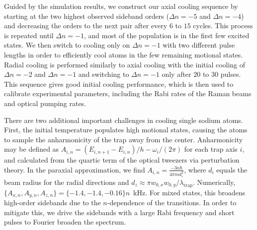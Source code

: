 \documentclass[aps,prl,twocolumn,groupedaddress]{revtex4-1}
\begin{document}
Guided by the simulation results,
we construct our axial cooling sequence by starting at the two highest
observed sideband orders ($\Delta n=-5$ and $\Delta n=-4$)
and decreasing the orders to the next pair after every $6$ to $15$ cycles.
This process is repeated until $\Delta n=-1$,
and most of the population is in the first few excited states.
We then switch to cooling only on $\Delta n=-1$ with two different pulse lengths
in order to efficiently cool atoms in the few remaining motional states.
Radial cooling is performed similarly to axial cooling with the initial cooling
of $\Delta n=-2$ and $\Delta n=-1$ and switching to $\Delta n=-1$ only after $20$ to $30$ pulses.
This sequence gives good initial cooling performance, which is then used to calibrate experimental
parameters, including the Rabi rates of the Raman beams and optical pumping rates.

There are two additional important challenges in cooling single sodium atoms.
First, the initial temperature populates high motional states,
causing the atoms to sample the anharmonicity of the trap away from the center.
Anharmonicity may be defined as $A_{i,n}=(E_{i,n+1}-E_{i,n})/h - \omega_i/(2\pi)$
for each trap axis $i$, and calculated from the quartic term
of the optical tweezers via perturbation theory.
In the paraxial approximation, we find $A_{i,n}=\frac{-3n\hbar}{4\pi m d_i^2}$,
where $d_i$ equals the beam radius for the radial directions and
$d_z\approx\pi w_{0,x}w_{0,y}/\lambda_{\textrm{trap}}$.
Numerically, $\{A_{x,n},A_{y,n},A_{z,n}\}=\{-1.4, -1.4, -0.16\}n$~kHz.
For mixed states, this broadens high-order sidebands due to the $n$-dependence of the transitions.
In order to mitigate this, we drive the sidebands with a large Rabi frequency
and short pulses to Fourier broaden the spectrum.
\end{document}
